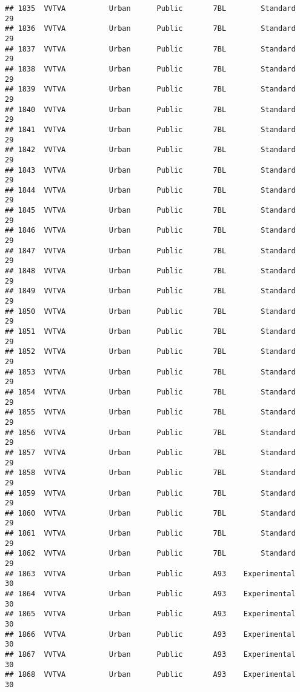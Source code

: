 \documentclass[
]{article}
\begin{document}
\begin{verbatim}
## 1835  VVTVA          Urban      Public       7BL        Standard        29
## 1836  VVTVA          Urban      Public       7BL        Standard        29
## 1837  VVTVA          Urban      Public       7BL        Standard        29
## 1838  VVTVA          Urban      Public       7BL        Standard        29
## 1839  VVTVA          Urban      Public       7BL        Standard        29
## 1840  VVTVA          Urban      Public       7BL        Standard        29
## 1841  VVTVA          Urban      Public       7BL        Standard        29
## 1842  VVTVA          Urban      Public       7BL        Standard        29
## 1843  VVTVA          Urban      Public       7BL        Standard        29
## 1844  VVTVA          Urban      Public       7BL        Standard        29
## 1845  VVTVA          Urban      Public       7BL        Standard        29
## 1846  VVTVA          Urban      Public       7BL        Standard        29
## 1847  VVTVA          Urban      Public       7BL        Standard        29
## 1848  VVTVA          Urban      Public       7BL        Standard        29
## 1849  VVTVA          Urban      Public       7BL        Standard        29
## 1850  VVTVA          Urban      Public       7BL        Standard        29
## 1851  VVTVA          Urban      Public       7BL        Standard        29
## 1852  VVTVA          Urban      Public       7BL        Standard        29
## 1853  VVTVA          Urban      Public       7BL        Standard        29
## 1854  VVTVA          Urban      Public       7BL        Standard        29
## 1855  VVTVA          Urban      Public       7BL        Standard        29
## 1856  VVTVA          Urban      Public       7BL        Standard        29
## 1857  VVTVA          Urban      Public       7BL        Standard        29
## 1858  VVTVA          Urban      Public       7BL        Standard        29
## 1859  VVTVA          Urban      Public       7BL        Standard        29
## 1860  VVTVA          Urban      Public       7BL        Standard        29
## 1861  VVTVA          Urban      Public       7BL        Standard        29
## 1862  VVTVA          Urban      Public       7BL        Standard        29
## 1863  VVTVA          Urban      Public       A93    Experimental        30
## 1864  VVTVA          Urban      Public       A93    Experimental        30
## 1865  VVTVA          Urban      Public       A93    Experimental        30
## 1866  VVTVA          Urban      Public       A93    Experimental        30
## 1867  VVTVA          Urban      Public       A93    Experimental        30
## 1868  VVTVA          Urban      Public       A93    Experimental        30

\end{verbatim}
\end{document}
